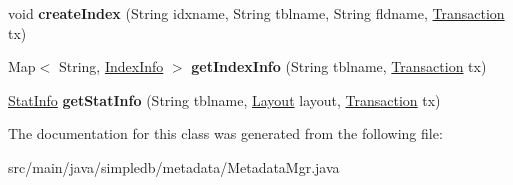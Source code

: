 \begin{DoxyCompactItemize}
void {\bfseries create\+Index} (String idxname, String tblname, String fldname, \hyperlink{classsimpledb_1_1tx_1_1Transaction}{Transaction} tx)
\item 
\mbox{\label{classsimpledb_1_1metadata_1_1MetadataMgr_a83ffd19e219d3298a7a71bbe1f04e592}} 
Map$<$ String, \hyperlink{classsimpledb_1_1metadata_1_1IndexInfo}{Index\+Info} $>$ {\bfseries get\+Index\+Info} (String tblname, \hyperlink{classsimpledb_1_1tx_1_1Transaction}{Transaction} tx)
\item 
\mbox{\label{classsimpledb_1_1metadata_1_1MetadataMgr_affcdf17eb7d5f6bde4752ecf42108fe3}} 
\hyperlink{classsimpledb_1_1metadata_1_1StatInfo}{Stat\+Info} {\bfseries get\+Stat\+Info} (String tblname, \hyperlink{classsimpledb_1_1record_1_1Layout}{Layout} layout, \hyperlink{classsimpledb_1_1tx_1_1Transaction}{Transaction} tx)
\end{DoxyCompactItemize}


The documentation for this class was generated from the following file\+:\begin{DoxyCompactItemize}
\item 
src/main/java/simpledb/metadata/Metadata\+Mgr.\+java\end{DoxyCompactItemize}
